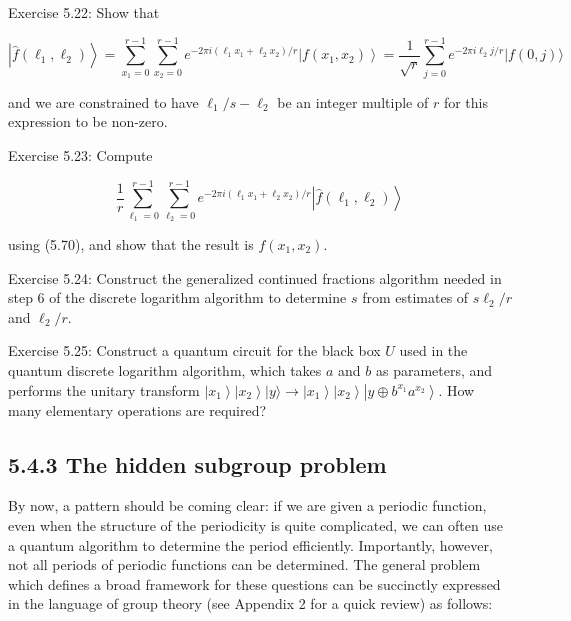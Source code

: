 Exercise 5.22: Show that

\begin{equation*}
\left|\hat{f}\left(\ell_{1}, \ell_{2}\right)\right\rangle=\sum_{x_{1}=0}^{r-1} \sum_{x_{2}=0}^{r-1} e^{-2 \pi i\left(\ell_{1} x_{1}+\ell_{2} x_{2}\right) / r}\left|f\left(x_{1}, x_{2}\right)\right\rangle=\frac{1}{\sqrt{r}} \sum_{j=0}^{r-1} e^{-2 \pi i \ell_{2} j / r}|f(0, j)\rangle \tag{5.72}
\end{equation*}

and we are constrained to have $\ell_{1} / s-\ell_{2}$ be an integer multiple of $r$ for this expression to be non-zero.

Exercise 5.23: Compute

\begin{equation*}
\frac{1}{r} \sum_{\ell_{1}=0}^{r-1} \sum_{\ell_{2}=0}^{r-1} e^{-2 \pi i\left(\ell_{1} x_{1}+\ell_{2} x_{2}\right) / r}\left|\hat{f}\left(\ell_{1}, \ell_{2}\right)\right\rangle \tag{5.73}
\end{equation*}

using (5.70), and show that the result is $f\left(x_{1}, x_{2}\right)$.

Exercise 5.24: Construct the generalized continued fractions algorithm needed in\\
step 6 of the discrete logarithm algorithm to determine $s$ from estimates of $s \ell_{2} / r$ and $\ell_{2} / r$.

Exercise 5.25: Construct a quantum circuit for the black box $U$ used in the quantum discrete logarithm algorithm, which takes $a$ and $b$ as parameters, and performs the unitary transform $\left|x_{1}\right\rangle\left|x_{2}\right\rangle|y\rangle \rightarrow\left|x_{1}\right\rangle\left|x_{2}\right\rangle\left|y \oplus b^{x_{1}} a^{x_{2}}\right\rangle$. How many elementary operations are required?

\subsection*{5.4.3 The hidden subgroup problem}
By now, a pattern should be coming clear: if we are given a periodic function, even when the structure of the periodicity is quite complicated, we can often use a quantum algorithm to determine the period efficiently. Importantly, however, not all periods of periodic functions can be determined. The general problem which defines a broad framework for these questions can be succinctly expressed in the language of group theory (see Appendix 2 for a quick review) as follows:

